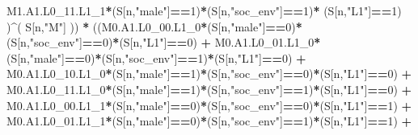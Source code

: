 \documentclass[
]{book}
\newenvironment{Shaded}{\begin{snugshade}}{\end{snugshade}}
\newcommand{\DecValTok}[1]{\textcolor[rgb]{0.00,0.00,0.81}{#1}}
\newcommand{\NormalTok}[1]{#1}
\newcommand{\SpecialCharTok}[1]{\textcolor[rgb]{0.81,0.36,0.00}{\textbf{#1}}}
\newcommand{\StringTok}[1]{\textcolor[rgb]{0.31,0.60,0.02}{#1}}
\begin{document}
\begin{Shaded}
\begin{Highlighting}[]
\NormalTok{          M1.A1.L0\_11.L1\_1}\SpecialCharTok{*}\NormalTok{(S[n,}\StringTok{"male"}\NormalTok{]}\SpecialCharTok{==}\DecValTok{1}\NormalTok{)}\SpecialCharTok{*}\NormalTok{(S[n,}\StringTok{"soc\_env"}\NormalTok{]}\SpecialCharTok{==}\DecValTok{1}\NormalTok{)}\SpecialCharTok{*}
\NormalTok{          (S[n,}\StringTok{"L1"}\NormalTok{]}\SpecialCharTok{==}\DecValTok{1}\NormalTok{) )}\SpecialCharTok{\^{}}\NormalTok{( S[n,}\StringTok{"M"}\NormalTok{] )) }\SpecialCharTok{*}
\NormalTok{      ((M0.A1.L0\_00.L1\_0}\SpecialCharTok{*}\NormalTok{(S[n,}\StringTok{"male"}\NormalTok{]}\SpecialCharTok{==}\DecValTok{0}\NormalTok{)}\SpecialCharTok{*}\NormalTok{(S[n,}\StringTok{"soc\_env"}\NormalTok{]}\SpecialCharTok{==}\DecValTok{0}\NormalTok{)}\SpecialCharTok{*}\NormalTok{(S[n,}\StringTok{"L1"}\NormalTok{]}\SpecialCharTok{==}\DecValTok{0}\NormalTok{) }\SpecialCharTok{+}                
\NormalTok{          M0.A1.L0\_01.L1\_0}\SpecialCharTok{*}\NormalTok{(S[n,}\StringTok{"male"}\NormalTok{]}\SpecialCharTok{==}\DecValTok{0}\NormalTok{)}\SpecialCharTok{*}\NormalTok{(S[n,}\StringTok{"soc\_env"}\NormalTok{]}\SpecialCharTok{==}\DecValTok{1}\NormalTok{)}\SpecialCharTok{*}\NormalTok{(S[n,}\StringTok{"L1"}\NormalTok{]}\SpecialCharTok{==}\DecValTok{0}\NormalTok{) }\SpecialCharTok{+}
\NormalTok{          M0.A1.L0\_10.L1\_0}\SpecialCharTok{*}\NormalTok{(S[n,}\StringTok{"male"}\NormalTok{]}\SpecialCharTok{==}\DecValTok{1}\NormalTok{)}\SpecialCharTok{*}\NormalTok{(S[n,}\StringTok{"soc\_env"}\NormalTok{]}\SpecialCharTok{==}\DecValTok{0}\NormalTok{)}\SpecialCharTok{*}\NormalTok{(S[n,}\StringTok{"L1"}\NormalTok{]}\SpecialCharTok{==}\DecValTok{0}\NormalTok{) }\SpecialCharTok{+} 
\NormalTok{          M0.A1.L0\_11.L1\_0}\SpecialCharTok{*}\NormalTok{(S[n,}\StringTok{"male"}\NormalTok{]}\SpecialCharTok{==}\DecValTok{1}\NormalTok{)}\SpecialCharTok{*}\NormalTok{(S[n,}\StringTok{"soc\_env"}\NormalTok{]}\SpecialCharTok{==}\DecValTok{1}\NormalTok{)}\SpecialCharTok{*}\NormalTok{(S[n,}\StringTok{"L1"}\NormalTok{]}\SpecialCharTok{==}\DecValTok{0}\NormalTok{) }\SpecialCharTok{+}
\NormalTok{          M0.A1.L0\_00.L1\_1}\SpecialCharTok{*}\NormalTok{(S[n,}\StringTok{"male"}\NormalTok{]}\SpecialCharTok{==}\DecValTok{0}\NormalTok{)}\SpecialCharTok{*}\NormalTok{(S[n,}\StringTok{"soc\_env"}\NormalTok{]}\SpecialCharTok{==}\DecValTok{0}\NormalTok{)}\SpecialCharTok{*}\NormalTok{(S[n,}\StringTok{"L1"}\NormalTok{]}\SpecialCharTok{==}\DecValTok{1}\NormalTok{) }\SpecialCharTok{+}
\NormalTok{          M0.A1.L0\_01.L1\_1}\SpecialCharTok{*}\NormalTok{(S[n,}\StringTok{"male"}\NormalTok{]}\SpecialCharTok{==}\DecValTok{0}\NormalTok{)}\SpecialCharTok{*}\NormalTok{(S[n,}\StringTok{"soc\_env"}\NormalTok{]}\SpecialCharTok{==}\DecValTok{1}\NormalTok{)}\SpecialCharTok{*}\NormalTok{(S[n,}\StringTok{"L1"}\NormalTok{]}\SpecialCharTok{==}\DecValTok{1}\NormalTok{) }\SpecialCharTok{+}

\end{Highlighting}
\end{Shaded}
\end{document}
